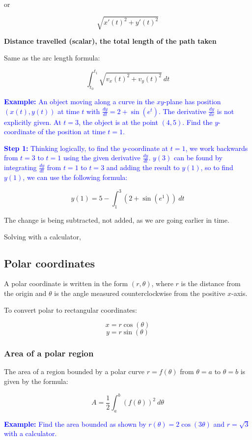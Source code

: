 \documentclass[letterpaper, 12pt]{article}
\newcommand{\example}[1]{\textcolor{blue}{\textbf{Example:} #1}}
\newcommand{\step}[2]{\textcolor{blue}{\textbf{Step #1:} #2}}
\begin{document}
or

$$\sqrt{x'(t)^2 + y'(t)^2}$$

\textbf{Distance travelled (scalar), the total length of the path taken}

Same as the arc length formula:

$$\int_{t_0}^{t_1} \sqrt{v_x(t)^2 + v_y(t)^2} \: dt$$

\example{An object moving along a curve in the $xy$-plane has position $(x(t), y(t))$ at time $t$ with $\frac{dy}{dt} = 2 + \sin\left(e^t\right)$. The derivative $\frac{dy}{dx}$ is not explicitly given. At $t=3$, the object is at the point $(4, 5)$. Find the $y$-coordinate of the position at time $t = 1$.}

\step{1}{Thinking logically, to find the $y$-coordinate at $t=1$, we work backwards from $t=3$ to $t=1$ using the given derivative $\frac{dy}{dt}$. $y(3)$ can be found by integrating $\frac{dy}{dt}$ from $t=1$ to $t=3$ and adding the result to $y(1)$, so to find $y(1)$, we can use the following formula:}

$$y(1) = 5 - \int_1^3 (2 + \sin(e^1)) \: dt$$

The change is being subtracted, not added, as we are going earlier in time.

Solving with a calculator, 

\subsection*{Polar coordinates}

A polar coordinate is written in the form $(r, \theta)$, where $r$ is the distance from the origin and $\theta$ is the angle measured counterclockwise from the positive $x$-axis.

To convert polar to rectangular coordinates:

$$x = r\cos(\theta)$$
$$y = r\sin(\theta)$$

\subsubsection*{Area of a polar region}

The area of a region bounded by a polar curve $r = f(\theta)$ from $\theta = a$ to $\theta = b$ is given by the formula:

$$A = \frac{1}{2} \int_a^b (f(\theta))^2 \: d\theta$$

\example{Find the area bounded as shown by $r(\theta) = 2\cos(3\theta)$ and $r = \sqrt{3}$ with a calculator.}
\end{document}
